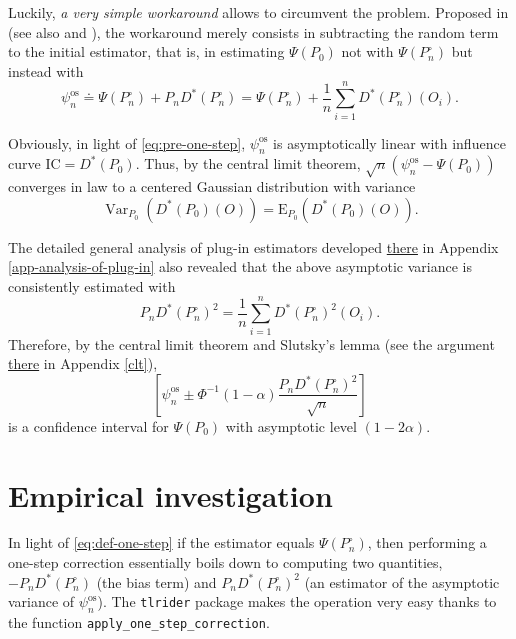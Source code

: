 \documentclass[11pt,openright,twoside]{book}
\DeclareMathOperator{\Var}{Var}
\newcommand{\defq}{\doteq}
\newcommand{\Exp}{\textrm{E}}
\newcommand{\IC}{\textrm{IC}}
\newcommand{\psinos}{\psi_{n}^{\textrm{os}}}
\newcommand{\Phat}{P^{\circ}}
\theoremstyle{definition}
\theoremstyle{definition}
\theoremstyle{definition}
\theoremstyle{remark}
\begin{document}
Luckily, \emph{a very simple workaround} allows to circumvent the problem. Proposed
in \citep{LeCam69} (see also \citep{Pfanzagl82} and \citep{vdV98}), the workaround merely
consists in subtracting the random term to the initial estimator, that is, in
estimating \(\Psi(P_0)\) not with \(\Psi(\Phat_n)\) but instead with
\begin{equation}
\psinos  \defq  \Psi(\Phat_n)  +  P_{n} D^*(\Phat_n)  =  \Psi(\Phat_n)  +
\frac{1}{n} \sum_{i=1}^{n} D^*(\Phat_n)(O_{i}). \label{eq:def-one-step}
\end{equation}

Obviously, in light of \eqref{eq:pre-one-step}, \(\psinos\) is asymptotically
linear with influence curve \(\IC=D^{*}(P_{0})\). Thus, by the central limit
theorem, \(\sqrt{n} (\psinos - \Psi(P_0))\) converges in law to a centered
Gaussian distribution with variance
\begin{equation}
  \Var_{P_0}(D^{*}(P_{0})(O)) = \Exp_{P_0}(D^{*}(P_{0})(O)).
\end{equation}

The detailed general analysis of plug-in estimators
developed \protect\hyperlink{app-analysis-of-plug-in}{there} in Appendix
\ref{app-analysis-of-plug-in} also revealed that the above asymptotic
variance is consistently estimated with \begin{equation}    P_{n}
D^{*}(\Phat_{n})^{2}  =  \frac{1}{n}  \sum_{i=1}^{n}  D^*(\Phat_n)^{2}(O_{i}).
\end{equation} Therefore, by the central limit theorem and Slutsky's lemma
(see the argument \protect\hyperlink{clt}{there} in Appendix \ref{clt}), \begin{equation*}
\left[\psinos           \pm          \Phi^{-1}(1-\alpha)           \frac{P_{n}
D^{*}(\Phat_{n})^{2}}{\sqrt{n}}\right]   \end{equation*} is a confidence
interval for \(\Psi(P_0)\) with asymptotic level \((1-2\alpha)\).

\hypertarget{empirical-inves-one-step}{%
\section{Empirical investigation}\label{empirical-inves-one-step}}

In light of \eqref{eq:def-one-step} if the estimator equals \(\Psi(\Phat_{n})\),
then performing a one-step correction essentially boils down to computing two
quantities, \(-P_{n} D^{*}(\Phat_{n})\) (the bias term) and \(P_{n} D^{*}(\Phat_{n})^{2}\) (an estimator of the asymptotic variance of
\(\psinos\)). The \texttt{tlrider} package makes the operation very easy thanks to the
function \texttt{apply\_one\_step\_correction}.
\end{document}
